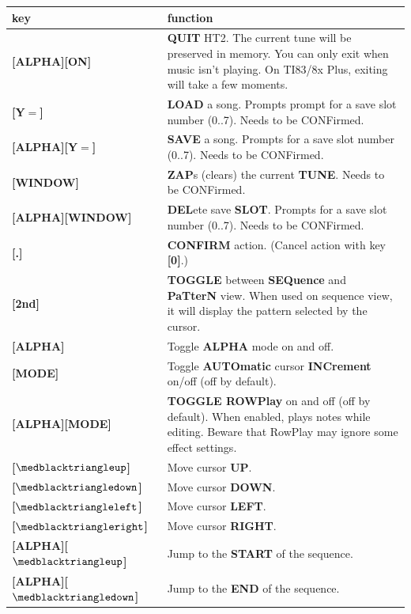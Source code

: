 \documentclass[12pt]{report}	%
\begin{document}
\newpage
\begin{longtable}{p{} p{} }
\textbf{key} & \textbf{function} \\
\hline

\textbf{[ALPHA][ON]} & \textbf{QUIT} HT2. The current tune will be preserved in memory. You can only exit when music isn't playing. On TI83/8x Plus, exiting will take a few moments. \\
\textbf{[Y$\bm{=}$]} & \textbf{LOAD} a song. Prompts prompt for a save slot number (0..7). Needs to be CONFirmed. \\
\textbf{[ALPHA][Y$\bm{=}$]} & \textbf{SAVE} a song. Prompts for a save slot number (0..7). Needs to be CONFirmed. \\
\textbf{[WINDOW]} & \textbf{ZAP}s (clears) the current \textbf{TUNE}. Needs to be CONFirmed. \\
\textbf{[ALPHA][WINDOW]} & \textbf{DEL}ete save \textbf{SLOT}. Prompts for a save slot number (0..7). Needs to be CONFirmed. \\
\hline
\textbf{[.]} & \textbf{CONFIRM} action. (Cancel action with key \textbf{[0]}.) \\
\hline
\textbf{[2nd]} & \textbf{TOGGLE} between \textbf{SEQuence} and \textbf{PaTterN} view. When used on sequence view, it will display the pattern selected by the cursor. \\
\textbf{[ALPHA]} & Toggle \textbf{ALPHA} mode on and off. \\
\hline
\textbf{[MODE]} & Toggle \textbf{AUTOmatic} cursor \textbf{INCrement} on/off (off by default). \\
\textbf{[ALPHA][MODE]} & \textbf{TOGGLE ROWPlay} on and off (off by default). When enabled, plays notes while editing. Beware that \mbox{RowPlay} may ignore some effect settings. \\
\hline
\textbf{[\(\medblacktriangleup\)]} & Move cursor \textbf{UP}. \\
\textbf{[\(\medblacktriangledown\)]} & Move cursor \textbf{DOWN}. \\
\textbf{[\(\medblacktriangleleft\)]} & Move cursor \textbf{LEFT}. \\
\textbf{[\(\medblacktriangleright\)]} & Move cursor \textbf{RIGHT}. \\
\textbf{[ALPHA][\(\medblacktriangleup\)]} & Jump to the \textbf{START} of the sequence. \\
\textbf{[ALPHA][\(\medblacktriangledown\)]} & Jump to the \textbf{END} of the sequence. \\

\end{longtable}
\end{document}
